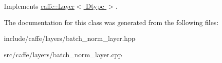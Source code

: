 Implements \hyperlink{classcaffe_1_1Layer_ad9d391b972c769c0ebee34ca6d1c973e}{caffe\+::\+Layer$<$ Dtype $>$}.



The documentation for this class was generated from the following files\+:\begin{DoxyCompactItemize}
\item 
include/caffe/layers/batch\+\_\+norm\+\_\+layer.\+hpp\item 
src/caffe/layers/batch\+\_\+norm\+\_\+layer.\+cpp\end{DoxyCompactItemize}
